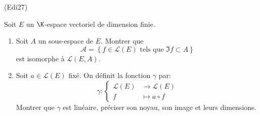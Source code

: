 \begin{tiny}(Edi27)\end{tiny} \label{exo: di27} Soit $E$ un $\K$-espace vectoriel de dimension finie.
\begin{enumerate}
 \item Soit $A$ un sous-espace de $E$. Montrer que 
\[
 \mathcal{A} = \left\lbrace f\in \mathcal{L}(E) \text{ tels que } \Im f \subset A\right\rbrace 
\]
est isomorphe à $\mathcal{L}(E,A)$.
 \item Soit $a\in \mathcal{L}(E)$ fixé. On définit la fonction $\gamma$ par:
\begin{displaymath}
  \gamma:
\left\lbrace 
\begin{aligned}
  \mathcal{L}(E) &\rightarrow \mathcal{L}(E) \\ f &\mapsto a \circ f
\end{aligned}
\right. 
\end{displaymath}
Montrer que $\gamma$ est linéaire, préciser son noyau, son image et leurs dimensions.

\end{enumerate}